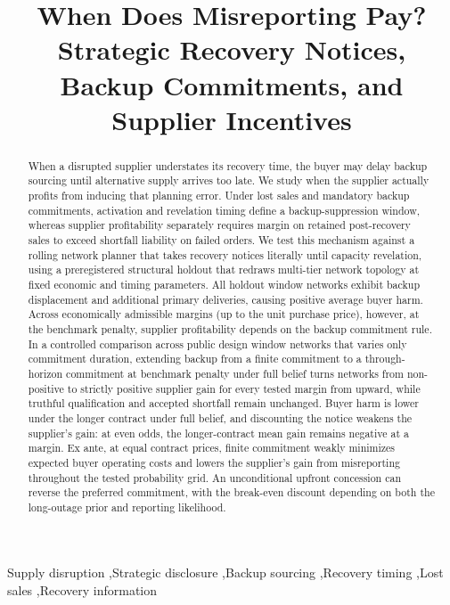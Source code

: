 \documentclass[preprint,11pt,authoryear]{elsarticle}
\begin{document}
\begin{frontmatter}
\title{When Does Misreporting Pay? Strategic Recovery Notices, Backup Commitments, and Supplier Incentives}
\begin{abstract}
When a disrupted supplier understates its recovery time, the buyer may delay backup sourcing until alternative supply arrives too late. We study when the supplier actually profits from inducing that planning error. Under lost sales and mandatory backup commitments, activation and revelation timing define a backup-suppression window, whereas supplier profitability separately requires margin on retained post-recovery sales to exceed shortfall liability on failed orders. We test this mechanism against a rolling network planner that takes recovery notices literally until capacity revelation, using a preregistered structural holdout that redraws multi-tier network topology at fixed economic and timing parameters. All  holdout window networks exhibit backup displacement and additional primary deliveries, causing positive average buyer harm. Across economically admissible margins (up to the unit purchase price), however, at the benchmark penalty, supplier profitability depends on the backup commitment rule. In a controlled comparison across  public design window networks that varies only commitment duration, extending backup from a finite commitment to a through-horizon commitment at benchmark penalty  under full belief turns  networks from non-positive to strictly positive supplier gain for every tested margin from  upward, while truthful qualification and accepted shortfall remain unchanged. Buyer harm is lower under the longer contract under full belief, and discounting the notice weakens the supplier's gain: at even odds, the longer-contract mean gain remains negative at a  margin. Ex ante, at equal contract prices, finite commitment weakly minimizes expected buyer operating costs and lowers the supplier's gain from misreporting throughout the tested probability grid. An unconditional upfront concession can reverse the preferred commitment, with the break-even discount depending on both the long-outage prior and reporting likelihood.
\end{abstract}
\begin{keyword}
Supply disruption \sep Strategic disclosure \sep Backup sourcing \sep Recovery timing \sep Lost sales \sep Recovery information
\end{keyword}
\end{frontmatter}
\end{document}
